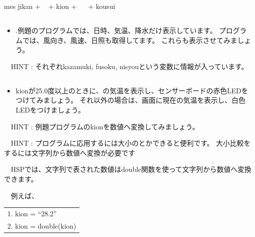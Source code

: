 mes jikan + {\textquotedbl} \ {\textquotedbl} + kion + {\textquotedbl} \ \ {\textquotedbl} + kousui

\clearpage\subsection*{\theQuestion\label{Q:amedas1}}
\begin{itemize}
\item
.例題のプログラムでは、日時、気温、降水だけ表示しています。
		プログラムでは、風向き、風速、日照も取得してます。
		これらも表示させてみましょう。
\end{itemize}
\ \ HINT : それぞれkazamuki, fusoku,
nisyouという変数に情報が入っています。

\subsection*{\theQuestion\label{Q:amedas2}}
\begin{itemize}
\item
kionが25.0度以上のときに、の気温を表示し、センサーボードの赤色LEDをつけてみましょう。
		それ以外の場合は、画面に現在の気温を表示し、白色LEDをつけましょう。
\end{itemize}
\ \ HINT :
例題プログラムのkionを数値へ変換してみましょう。

\ \ HINT :
プログラムに応用するには大小のとかできると便利です。
大小比較をするには文字列から数値へ変換が必要です

\ \ HSPでは、文字列で表された数値はdouble関数を使って文字列から数値へ変換できます。

\ \ 例えば、






\begin{table}[htbp]
    \centering
    \begin{tabular}{|l|}
        \hline
        
        1. kion = “28.2”\\
        2. kion = double(kion)
        \\\hline
    \end{tabular}
\end{table}


